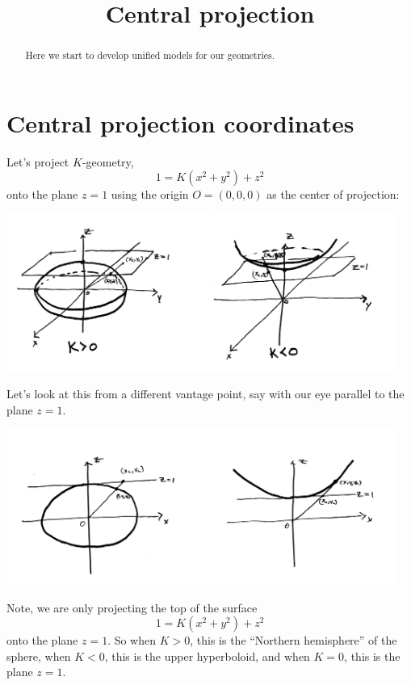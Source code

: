 \documentclass{ximera}
\title{Central projection}
\begin{document}
\begin{abstract}
Here we start to develop unified models for our geometries.
\end{abstract}
\maketitle

\section{Central projection coordinates}

Let's project $K$-geometry,
\[
1=K\left(x^{2}+y^{2}\right)+z^{2} 
\]
onto the plane $z=1$ using the origin $O=(0,0,0)$ as the center of
projection:
\begin{image}
\includegraphics[width=5in]{KGeomCentralProjection.png}
\end{image}
Let's look at this from a different vantage point, say with our eye parallel to the plane $z=1$.
\begin{image}
\includegraphics[width=5in]{2dCentralProjection.png}
\end{image}
Note, we are only projecting the top of the surface
\[
1=K\left(x^{2}+y^{2}\right)+z^{2} 
\]
onto the plane $z=1$. So when $K>0$, this is the ``Northern hemisphere'' of
the sphere, when $K<0$, this is the upper hyperboloid, and when $K=0$,
this is the plane $z=1$.
\end{document}
